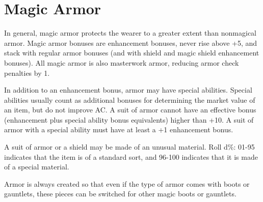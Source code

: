 
\section{Magic Armor}

In general, magic armor protects the wearer to a greater extent than nonmagical 
armor. Magic armor bonuses are enhancement bonuses, never rise above +5, and stack 
with regular armor bonuses (and with shield and magic shield enhancement bonuses). 
All magic armor is also masterwork armor, reducing armor check penalties by 1.

In addition to an enhancement bonus, armor may have special abilities. Special 
abilities usually count as additional bonuses for determining the market value 
of an item, but do not improve AC. A suit of armor cannot have an effective bonus 
(enhancement plus special ability bonus equivalents) higher than +10. A suit of 
armor with a special ability must have at least a +1 enhancement bonus.

A suit of armor or a shield may be made of an unusual material. Roll d\%: 01-95 
indicates that the item is of a standard sort, and 96-100 indicates that it is 
made of a special material.

Armor is always created so that even if the type of armor comes with boots or gauntlets, 
these pieces can be switched for other magic boots or gauntlets.

